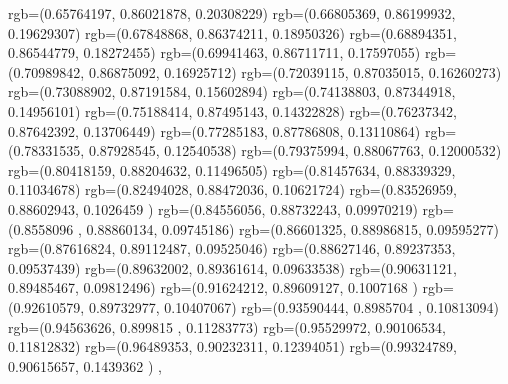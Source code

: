 {{{		  rgb=(0.65764197,  0.86021878,  0.20308229)
		  rgb=(0.66805369,  0.86199932,  0.19629307)
		  rgb=(0.67848868,  0.86374211,  0.18950326)
		  rgb=(0.68894351,  0.86544779,  0.18272455)
		  rgb=(0.69941463,  0.86711711,  0.17597055)
		  rgb=(0.70989842,  0.86875092,  0.16925712)
		  rgb=(0.72039115,  0.87035015,  0.16260273)
		  rgb=(0.73088902,  0.87191584,  0.15602894)
		  rgb=(0.74138803,  0.87344918,  0.14956101)
		  rgb=(0.75188414,  0.87495143,  0.14322828)
		  rgb=(0.76237342,  0.87642392,  0.13706449)
		  rgb=(0.77285183,  0.87786808,  0.13110864)
		  rgb=(0.78331535,  0.87928545,  0.12540538)
		  rgb=(0.79375994,  0.88067763,  0.12000532)
		  rgb=(0.80418159,  0.88204632,  0.11496505)
		  rgb=(0.81457634,  0.88339329,  0.11034678)
		  rgb=(0.82494028,  0.88472036,  0.10621724)
		  rgb=(0.83526959,  0.88602943,  0.1026459 )
		  rgb=(0.84556056,  0.88732243,  0.09970219)
		  rgb=(0.8558096 ,  0.88860134,  0.09745186)
		  rgb=(0.86601325,  0.88986815,  0.09595277)
		  rgb=(0.87616824,  0.89112487,  0.09525046)
		  rgb=(0.88627146,  0.89237353,  0.09537439)
		  rgb=(0.89632002,  0.89361614,  0.09633538)
		  rgb=(0.90631121,  0.89485467,  0.09812496)
		  rgb=(0.91624212,  0.89609127,  0.1007168 )
		  rgb=(0.92610579,  0.89732977,  0.10407067)
		  rgb=(0.93590444,  0.8985704 ,  0.10813094)
		  rgb=(0.94563626,  0.899815  ,  0.11283773)
		  rgb=(0.95529972,  0.90106534,  0.11812832)
		  rgb=(0.96489353,  0.90232311,  0.12394051)
		  rgb=(0.99324789,  0.90615657,  0.1439362 )
		},
	}
}

